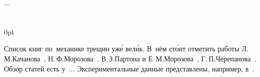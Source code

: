 ...



\section*{\small \wordforbibliography}

\begin{changemargin}{\parindent}{0pt}
\fontsize{10}{12}\selectfont

\begin{otherlanguage}{russian}

Список книг по~механике трещин уж\'{е} вел\'{и}к. В~нём ст\'{о}ит отметить работы Л.\,М.\;Качанова~\cite{kachanov-fracturemechanics}, Н.\,Ф.\;Морозова~\cite{morozov-fractures}, В.\,З.\;Партона и Е.\,М.\;Морозова~\cite{parton.morozov-destructionofelastoplastic}, Г.\,П.\;Черепанова~\cite{cherepanov-fragilefracture}. Обзор статей есть у~... Экспериментальные данные представлены, например, в~\cite{kerstein.klyushnikov.lomakin.shesterikov-experimentalfracturemechanics}.

\end{otherlanguage}

\end{changemargin}
